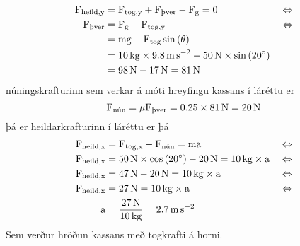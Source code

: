 \begin{formalexample}
\begin{align*}
	\uforce_\text{heild,y} & = \uforce_\text{tog,y} + \uforce_\text{þver} 
		- \uforce_\text{g} = 0 && \Leftrightarrow \\
	\uforce_\text{þver} & = \uforce_\text{g} - \uforce_\text{tog,y}
		&& \Leftrightarrow \\
		& = \umass \uacceleg - \uforce_\text{tog} \sin \left( \theta \right)
		&&  \\
		& = \SI{10}{\kg} \times \SI{9.8}{\m\per\s\squared} 
			- \SI{50}{\N} \times \sin \left( \SI{20}{\degree} \right)
		&&  \\
		& = \SI{98}{\N} - \SI{17}{\N} = \SI{81}{\N}
		&&  
\end{align*}
núningskrafturinn sem verkar á móti hreyfingu kassans í láréttu er
\[
	\uforce_\text{nún} = \mu \uforce_\text{þver} 
		= \num{0.25} \times \SI{81}{\N} = \SI{20}{\N}
\]
þá er heildarkrafturinn í láréttu er þá
\begin{align*}
	\uforce_\text{heild,x} & = \uforce_\text{tog,x} - \uforce_\text{nún} 
		 = \umass \uaccelea && \Leftrightarrow \\
	\uforce_\text{heild,x} & = \SI{50}{\N} 
			\times \cos \left( \SI{20}{\degree} \right)
			- \SI{20}{\N}
			= \SI{10}{\kg} \times \uaccelea 
		&& \Leftrightarrow \\
	\uforce_\text{heild,x} & = \SI{47}{\N}
			- \SI{20}{\N}
			= \SI{10}{\kg} \times  \uaccelea 
		&& \Leftrightarrow \\
	\uforce_\text{heild,x} & = \SI{27}{\N}
			= \SI{10}{\kg} \times \uaccelea 
		&& \Leftrightarrow \\
	\uaccelea & = \frac{ \SI{27}{\N} }{ \SI{10}{\kg} }
			= \SI{2.7}{\m\per\s\squared}
		&& 
\end{align*}
Sem verður hröðun kassans með togkrafti á horni.
\end{formalexample}
